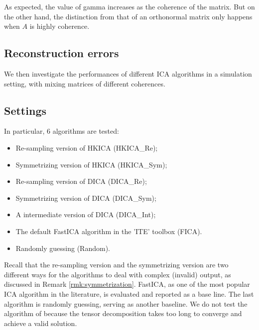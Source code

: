 \documentclass[twoside]{article}
\theoremstyle{definition}
\begin{document}
As expected, the value of gamma increases as the coherence of the matrix. 
But on the other hand, the distinction from that of an orthonormal matrix only happens when $A$ is highly coherence. 

\subsection{Reconstruction errors}
We then investigate the performances of different ICA algorithms in a simulation setting, with mixing matrices of different coherences. 

\subsection{Settings}
In particular, 6 algorithms are tested: 
\begin{itemize}
\vspace{-3mm}
\item Re-sampling version of  HKICA (HKICA\_Re);
\item Symmetrizing version of  HKICA  (HKICA\_Sym);
\item Re-sampling version of DICA  (DICA\_Re);
\item Symmetrizing version of  DICA  (DICA\_Sym);
\item A intermediate version of  DICA  (DICA\_Int);
\item The default FastICA algorithm in the 'ITE' toolbox \citep{szabo12separation} (FICA). 
\item  Randomly guessing (Random).
\end{itemize}
\vspace{-3mm}
Recall that the re-sampling version and the symmetrizing version are two different ways for the algorithms to deal with complex (invalid) output, as discussed in Remark \ref{rmk:symmetrization}.
FastICA, as one of the most popular ICA algorithm in the literature, is evaluated and reported as a base line. 
The last algorithm is randomly guessing, serving as another baseline.
We do not test the algorithm of \citep{anandkumar2012tensordecomposition} because the tensor decomposition takes too long to converge and achieve a valid solution. 
\end{document}
